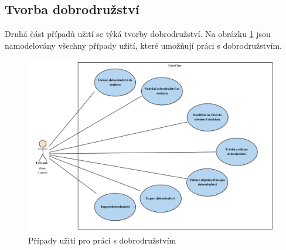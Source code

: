 \documentclass[thesis=B,czech]{resources/FITthesis}[2012/06/26]
\begin{document}
\subsection{Tvorba dobrodružství}
Druhá část případů užití se týká tvorby dobrodružství. Na obrázku \ref{fig:uc_dobrodruzstvi} jsou namodelovány všechny případy užití, které umožňují práci s dobrodružstvím.
	\begin{figure}\centering
		\includegraphics[width=1\textwidth]{images/usecase-dobrodruzstvi.pdf}
		\caption[Případy užití pro dobrodružství]{Případy užití pro práci s dobrodružstvím}			\label{fig:uc_dobrodruzstvi}
	\end{figure}
	
\end{document}
